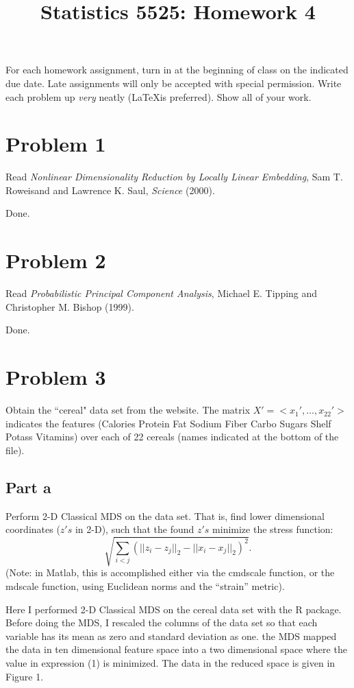 \documentclass[12pt]{article}
\date{}
\title{\begin{center}Statistics 5525: Homework 4\end{center}}
\newcounter{app}
\begin{document}
\maketitle
\newcommand{\argmin}{\text{argmin}}
\noindent For each homework assignment, turn in at the beginning of class on the indicated due date. Late assignments will only be accepted with special permission.
Write each problem up \emph{very} neatly (\LaTeX\quad  is preferred). Show all of your work.



\noindent
\section*{Problem 1}
Read \emph{Nonlinear Dimensionality 
Reduction by 
Locally Linear Embedding}, Sam T. Roweisand and Lawrence K. Saul, \emph{Science} (2000). 
 
Done.

\section*{Problem 2}
Read \emph{Probabilistic Principal Component Analysis}, Michael E. Tipping and Christopher M. Bishop (1999).  

Done. 

\section*{Problem 3}
Obtain the ``cereal" data set from the website.
The matrix $X' = <x_1',\dots,x_22'>$ indicates the features (Calories Protein Fat Sodium Fiber Carbo Sugars Shelf Potass Vitamins) over each of 22 cereals (names indicated at the bottom of the file).

\subsection*{Part a}
Perform 2-D Classical MDS on the data set.
That is, find lower dimensional coordinates ($z's$ in 2-D), such that the found $z's$ minimize the stress function:
\begin{equation}
\sqrt{\sum_{i< j}(||z_i-z_j||_2-||x_i-x_j ||_2)^2}.
\end{equation}
(Note: in Matlab, this is accomplished either via the cmdscale function, or the mdscale function, using Euclidean norms and the ``strain'' metric).


Here I performed 2-D Classical MDS on the cereal data set with the R package. Before doing the MDS, I rescaled the columns of the data set so that each variable has its mean as zero and standard deviation as one. the MDS mapped the data in ten dimensional feature space into a two dimensional space where the value in expression (1) is minimized. The data in the reduced space is given in Figure 1.
\end{document}
